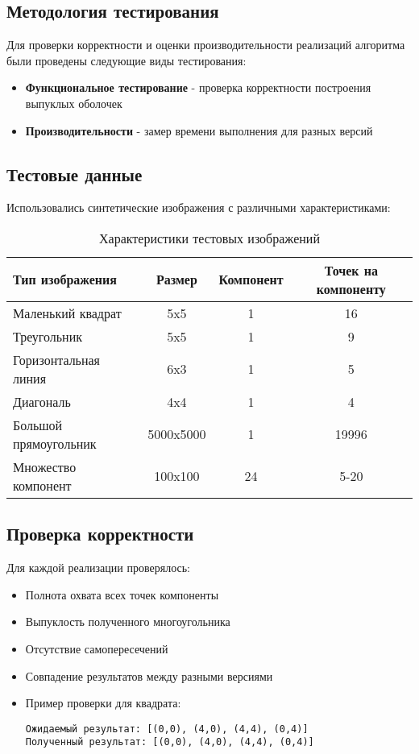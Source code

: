 \documentclass[12pt]{article}
\begin{document}
\subsection{Методология тестирования}
Для проверки корректности и оценки производительности реализаций алгоритма были проведены следующие виды тестирования:

\begin{itemize}
    \item \textbf{Функциональное тестирование} - проверка корректности построения выпуклых оболочек
    \item \textbf{Производительности} - замер времени выполнения для разных версий
\end{itemize}

\subsection{Тестовые данные}
Использовались синтетические изображения с различными характеристиками:

\begin{table}[h]
\centering
\caption{Характеристики тестовых изображений}
\begin{tabular}{|l|c|c|c|}
\hline
Тип изображения & Размер & Компонент & Точек на компоненту \\
\hline
Маленький квадрат & 5x5 & 1 & 16 \\
Треугольник & 5x5 & 1 & 9 \\
Горизонтальная линия & 6x3 & 1 & 5 \\
Диагональ & 4x4 & 1 & 4 \\
Большой прямоугольник & 5000x5000 & 1 & 19996 \\
Множество компонент & 100x100 & 24 & 5-20 \\
\hline
\end{tabular}
\end{table}

\subsection{Проверка корректности}
Для каждой реализации проверялось:

\begin{itemize}
    \item Полнота охвата всех точек компоненты
    \item Выпуклость полученного многоугольника
    \item Отсутствие самопересечений
    \item Совпадение результатов между разными версиями
    
    \item Пример проверки для квадрата:
    \begin{verbatim}
Ожидаемый результат: [(0,0), (4,0), (4,4), (0,4)]
Полученный результат: [(0,0), (4,0), (4,4), (0,4)]
    \end{verbatim}
\end{itemize}
\end{document}
